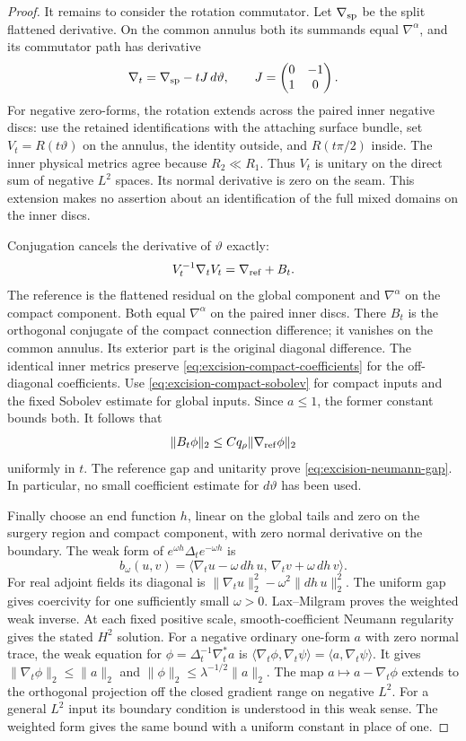 \documentclass[11pt]{amsart}
\theoremstyle{definition}
\theoremstyle{remark}
\theoremstyle{plain}
\begin{document}
\begin{proof}
It remains to consider the rotation commutator.
Let $\nabla_{\rm sp}$ be the split flattened derivative.
On the common annulus both its summands equal $\nabla^\alpha$,
and its commutator path has derivative
\[
 \nabla_t=\nabla_{\rm sp}-tJ\,d\vartheta,\qquad
 J=\begin{pmatrix}0&-1\\1&0\end{pmatrix}.
\]
For negative zero-forms, the rotation extends across the paired
inner negative discs: use the retained identifications with
the attaching surface bundle, set $V_t=R(t\vartheta)$ on the
annulus, the identity outside, and $R(t\pi/2)$ inside.
The inner physical metrics agree because $R_2\ll R_1$.
Thus $V_t$ is unitary on the direct sum of negative $L^2$ spaces.
Its normal derivative is zero on the seam.
This extension makes no assertion about an identification
of the full mixed domains on the inner discs.

Conjugation cancels the derivative of $\vartheta$ exactly:
\[
               V_t^{-1}\nabla_tV_t=\nabla_{\rm ref}+B_t.
\]
The reference is the flattened residual on the global component
and $\nabla^\alpha$ on the compact component. Both equal
$\nabla^\alpha$ on the paired inner discs.
There $B_t$ is the orthogonal conjugate of the compact
connection difference; it vanishes on the common annulus.
Its exterior part is the original diagonal difference.
The identical inner metrics preserve
\eqref{eq:excision-compact-coefficients} for the off-diagonal
coefficients. Use \eqref{eq:excision-compact-sobolev} for
compact inputs and the fixed Sobolev estimate for global
inputs. Since $a\leq1$, the former constant bounds both.
It follows that
\[
          \|B_t\phi\|_2\leq Cq_\rho\|\nabla_{\rm ref}\phi\|_2
\]
uniformly in $t$. The reference gap and unitarity prove
\eqref{eq:excision-neumann-gap}. In particular, no small
coefficient estimate for $d\vartheta$ has been used.

Finally choose an end function $h$, linear on the global tails
and zero on the surgery region and compact component, with
zero normal derivative on the boundary. The weak form of
$e^{\omega h}\Delta_t e^{-\omega h}$ is
\[
 b_\omega(u,v)=
  \langle\nabla_tu-\omega\,dh\,u,\,
                         \nabla_tv+\omega\,dh\,v\rangle .
\]
For real adjoint fields its diagonal is
$\|\nabla_tu\|_2^2-\omega^2\|dh\,u\|_2^2$.
The uniform gap gives coercivity for one sufficiently small
$\omega>0$. Lax--Milgram proves the weighted weak inverse.
At each fixed positive scale, smooth-coefficient Neumann
regularity gives the stated $H^2$ solution.
For a negative ordinary one-form $a$ with zero normal trace,
the weak equation for $\phi=\Delta_t^{-1}\nabla_t^*a$ is
$\langle\nabla_t\phi,\nabla_t\psi\rangle
=\langle a,\nabla_t\psi\rangle$.
It gives $\|\nabla_t\phi\|_2\leq\|a\|_2$ and
$\|\phi\|_2\leq\lambda^{-1/2}\|a\|_2$.
The map $a\mapsto a-\nabla_t\phi$ extends to the orthogonal
projection off the closed gradient range on negative $L^2$.
For a general $L^2$ input its boundary condition is understood
in this weak sense. The weighted form gives the same bound
with a uniform constant in place of one.
\end{proof}
\end{document}

